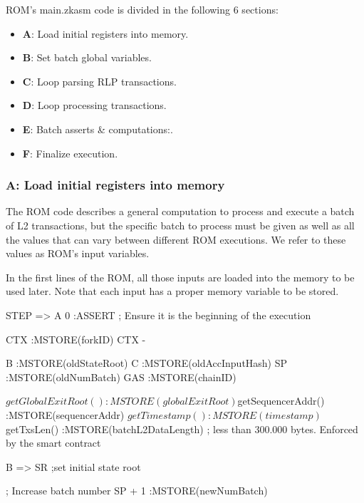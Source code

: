 ROM's main.zkasm code is divided in the following 6 sections:
\begin{itemize}
    \item \textbf{A}: Load initial registers into memory.
    \item \textbf{B}: Set batch global variables.
    \item \textbf{C}: Loop parsing RLP transactions.
    \item \textbf{D}: Loop processing transactions.
    \item \textbf{E}: Batch asserts \& computations:.
    \item \textbf{F}: Finalize execution.
\end{itemize}

\subsubsection{A: Load initial registers into memory}

The ROM code describes a general computation to process and execute a batch of L2 transactions, but the specific batch to process must be given as well as all the values that can vary between different ROM executions. We refer to these values as ROM's input variables.

In the first lines of the ROM, all those inputs are loaded into the memory to be used later. Note that each input has a proper memory variable to be stored.


\begin{zkasm}
    STEP => A
    0                                   :ASSERT ; Ensure it is the beginning of the execution
    
    CTX                                 :MSTORE(forkID)
    CTX - %
    
    B                                   :MSTORE(oldStateRoot)
    C                                   :MSTORE(oldAccInputHash)
    SP                                  :MSTORE(oldNumBatch)
    GAS                                 :MSTORE(chainID)
    
    ${getGlobalExitRoot()}              :MSTORE(globalExitRoot)
    ${getSequencerAddr()}               :MSTORE(sequencerAddr)
    ${getTimestamp()}                   :MSTORE(timestamp)
    ${getTxsLen()}                      :MSTORE(batchL2DataLength) ; less than 300.000 bytes. Enforced by the smart contract
    
    B => SR ;set initial state root
    
    ; Increase batch number
    SP + 1                              :MSTORE(newNumBatch)
\end{zkasm}


